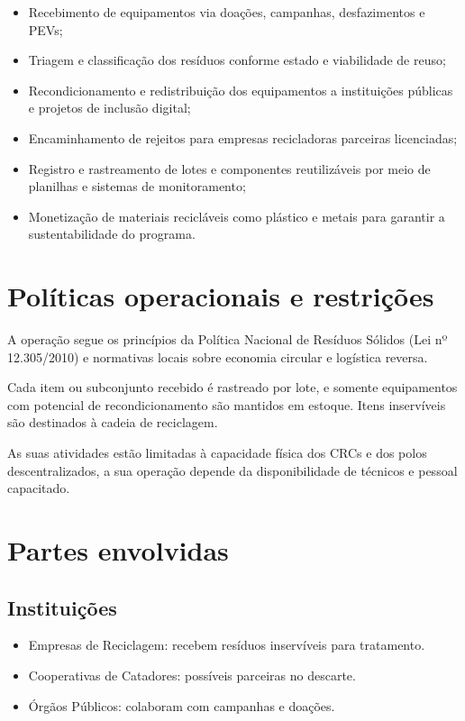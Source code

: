 \documentclass[
	12pt,				%
	openright,			%
	twoside,			%
	a4paper,			%
	english,			%
	french,				%
	spanish,			%
	brazil,				%
	]{abntex2}
\begin{document}
\begin{itemize}
  \item Recebimento de equipamentos via doações, campanhas, desfazimentos e PEVs;
  \item Triagem e classificação dos resíduos conforme estado e viabilidade de reuso;
  \item Recondicionamento e redistribuição dos equipamentos a instituições públicas e projetos de inclusão digital;
  \item Encaminhamento de rejeitos para empresas recicladoras parceiras licenciadas;
  \item Registro e rastreamento de lotes e componentes reutilizáveis por meio de planilhas e sistemas de monitoramento;
  \item Monetização de materiais recicláveis como plástico e metais para garantir a sustentabilidade do programa.
\end{itemize}

\section{Políticas operacionais e restrições}

A operação segue os princípios da Política Nacional de Resíduos Sólidos (Lei nº 12.305/2010) e normativas locais sobre economia circular e logística reversa.

Cada item ou subconjunto recebido é rastreado por lote, e somente equipamentos com potencial de recondicionamento são mantidos em estoque. Itens inservíveis são destinados à cadeia de reciclagem. 

As suas atividades estão limitadas à capacidade física dos CRCs e dos polos descentralizados, a sua operação depende da disponibilidade de técnicos e pessoal capacitado.

\section{Partes envolvidas}
\subsection{Instituições}
\begin{itemize}
  \item Empresas de Reciclagem: recebem resíduos inservíveis para tratamento.
  \item Cooperativas de Catadores: possíveis parceiras no descarte.
  \item Órgãos Públicos: colaboram com campanhas e doações.
\end{itemize}
\end{document}
